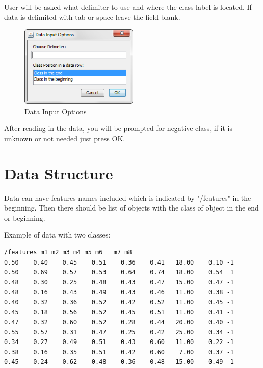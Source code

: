 \documentclass[a4paper,12pt,english]{report}
\begin{document}
User will be asked what delimiter to use and where the class label is located. If data is delimited with tab or space leave the field blank. 


\begin{figure}[htb]
\centering
\includegraphics[width=160pt]{s2.png}
\caption{Data Input Options}
\end{figure} 


After reading in the data, you will be prompted for negative class, if it is unknown or not needed just press OK.
\newpage
\section*{Data Structure}
Data can have features names included which is indicated by "/features" in the beginning. Then there should be list of objects with the class of object in the end or beginning. 

Example of data with two classes:

\begin{lstlisting}
/features m1 m2 m3 m4 m5 m6   m7 m8 
0.50    0.40    0.45    0.51    0.36    0.41   18.00    0.10 -1 
0.50    0.69    0.57    0.53    0.64    0.74   18.00    0.54  1   
0.48    0.30    0.25    0.48    0.43    0.47   15.00    0.47 -1
0.48    0.16    0.43    0.49    0.43    0.46   11.00    0.38 -1
0.40    0.32    0.36    0.52    0.42    0.52   11.00    0.45 -1
0.45    0.18    0.56    0.52    0.45    0.51   11.00    0.41 -1
0.47    0.32    0.60    0.52    0.28    0.44   20.00    0.40 -1
0.55    0.57    0.31    0.47    0.25    0.42   25.00    0.34 -1
0.34    0.27    0.49    0.51    0.43    0.60   11.00    0.22 -1
0.38    0.16    0.35    0.51    0.42    0.60    7.00    0.37 -1
0.45    0.24    0.62    0.48    0.36    0.48   15.00    0.49 -1  
\end{lstlisting}
\end{document}
